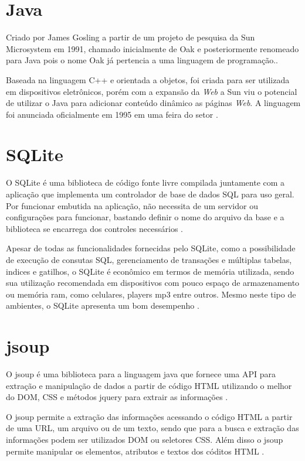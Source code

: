 \section{Java}

Criado por James Gosling a partir de um projeto de pesquisa da Sun Microsystem em 1991, chamado inicialmente de Oak e posteriormente renomeado para Java pois o nome Oak já pertencia a uma linguagem de programação.\cite{java_deitel}.

Baseada na linguagem C++ e orientada a objetos, foi criada para ser utilizada em dispositivos eletrônicos, porém com a expansão da \emph{Web} a Sun viu o potencial de utilizar o Java para adicionar conteúdo dinâmico as páginas \emph{Web}. A linguagem foi anunciada oficialmente em 1995 em uma feira do setor \cite{java_deitel}.

\section{SQLite}
O SQLite é uma biblioteca de código fonte livre compilada juntamente com a aplicação que implementa um controlador de base de dados SQL para uso geral. Por funcionar embutida na aplicação, não necessita de um servidor ou configurações para funcionar, bastando definir o nome do arquivo da base e a biblioteca se encarrega dos controles necessários \cite{SQLite}.

Apesar de todas as funcionalidades fornecidas pelo SQLite, como a possibilidade de execução de consutas SQL, gerenciamento de transações e múltiplas tabelas, indices e gatilhos, o SQLite é econômico em termos de memória utilizada, sendo sua utilização recomendada em dispositivos com pouco espaço de armazenamento ou memória ram, como celulares, players mp3 entre outros. Mesmo neste tipo de ambientes, o SQLite apresenta um bom desempenho \cite{SQLite}.

\section{jsoup}
O jsoup é uma biblioteca para a linguagem java que fornece uma API para extração e manipulação de dados a partir de código HTML utilizando o melhor do DOM, CSS e métodos jquery para extrair as informações \cite{JSOUP}.

O jsoup permite a extração das informações acessando o código HTML a partir de uma URL, um arquivo ou de um texto, sendo que para a busca e extração das informações podem ser utilizados DOM ou seletores CSS. Além disso o jsoup permite manipular os elementos, atributos e textos dos códitos HTML \cite{JSOUP}.

